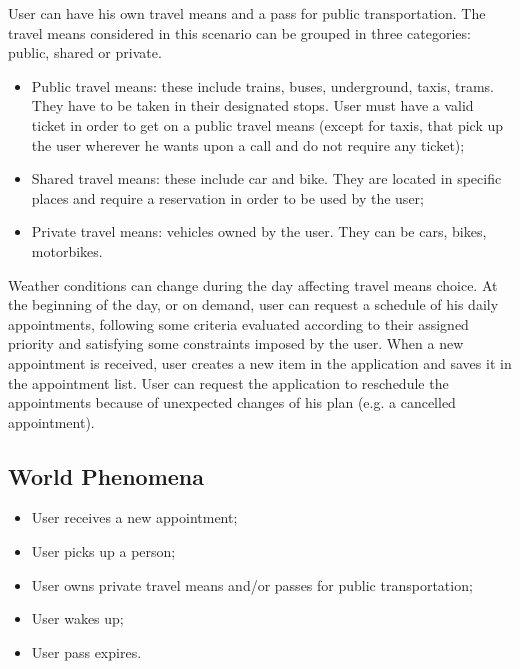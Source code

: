 User can have his own travel means and a pass for public transportation. 
The travel means considered in this scenario can be grouped in three categories: public, shared or private.
\begin{itemize}
\item Public travel means: these include trains, buses, underground, taxis, trams. They have to be taken in their designated stops. User must have a valid ticket in order to get on a public travel means (except for taxis, that pick up the user wherever he wants upon a call and do not require any ticket); 
\item Shared travel means: these include car and bike. They are located in specific places and require a reservation in order to be used by the user;
\item Private travel means: vehicles owned by the user. They can be cars, bikes, motorbikes.
\end{itemize}

Weather conditions can change during the day affecting travel means choice.
At the beginning of the day, or on demand, user can request a schedule of his daily appointments, following some criteria evaluated according to their assigned priority and satisfying some constraints imposed by the user.
When a new appointment is received, user creates a new item in the application and saves it in the appointment list. User can request the application to reschedule the appointments because of unexpected changes of his plan (e.g. a cancelled appointment).

\subsection{World Phenomena}
\begin{itemize}
\item User receives a new appointment;
\item User picks up a person;
\item User owns private travel means and/or passes for public transportation;
\item User wakes up;
\item User pass expires.
\end{itemize}


